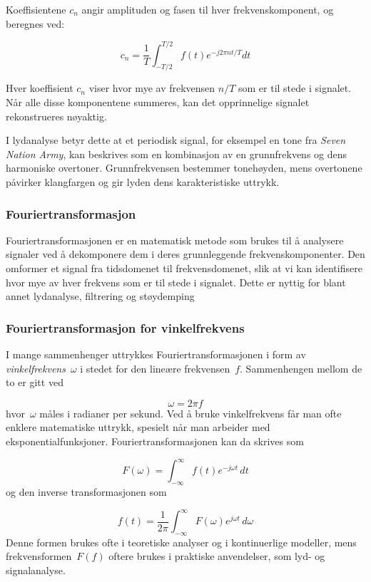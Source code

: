 Koeffisientene $c_n$ angir amplituden og fasen til hver frekvenskomponent, og beregnes ved:

\begin{equation*}
    c_n = \frac{1}{T} \int_{-T/2}^{T/2} f(t)e^{-j2\pi n t/T} dt
\end{equation*}

Hver koeffisient $c_n$ viser hvor mye av frekvensen $n/T$ som er til stede i signalet. 
Når alle disse komponentene summeres, kan det opprinnelige signalet rekonstrueres nøyaktig.  

I lydanalyse betyr dette at et periodisk signal, for eksempel en tone fra \textit{Seven Nation Army}, 
kan beskrives som en kombinasjon av en grunnfrekvens og dens harmoniske overtoner. Grunnfrekvensen bestemmer tonehøyden, 
mens overtonene påvirker klangfargen og gir lyden dens karakteristiske uttrykk.


\subsubsection{Fouriertransformasjon}
Fouriertransformasjonen er en matematisk metode som brukes til å analysere 
signaler ved å dekomponere dem i deres grunnleggende frekvenskomponenter. 
Den omformer et signal fra tidsdomenet til frekvensdomenet, slik at vi kan 
identifisere hvor mye av hver frekvens som er til stede i signalet. Dette er 
nyttig for blant annet lydanalyse, filtrering og støydemping


\subsubsection{Fouriertransformasjon for vinkel­frekvens}
I mange sammenhenger uttrykkes Fouriertransformasjonen i form av \emph{vinkelfrekvens}~$\omega$ i stedet for den lineære frekvensen~$f$. Sammenhengen mellom de to er gitt ved

\begin{equation}
    \omega = 2\pi f
\end{equation}
hvor~$\omega$ måles i radianer per sekund. Ved å bruke vinkelfrekvens får man ofte enklere matematiske uttrykk, spesielt når man arbeider med eksponentialfunksjoner. Fouriertransformasjonen kan da skrives som

\begin{equation}
    F(\omega) = \int_{-\infty}^{\infty} f(t)e^{-j\omega t}\,dt
\end{equation}
og den inverse transformasjonen som

\begin{equation}
    f(t) = \frac{1}{2\pi}\int_{-\infty}^{\infty} F(\omega)e^{j\omega t}\,d\omega
\end{equation}
Denne formen brukes ofte i teoretiske analyser og i kontinuerlige modeller, mens frekvensformen~$F(f)$ oftere brukes i praktiske anvendelser, som lyd- og signalanalyse.


